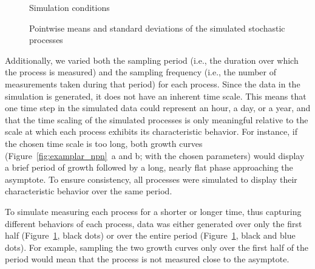 \documentclass[man, floatsintext]{apa7}
\begin{document}
\begin{figure}[!t]
  \caption{Simulation conditions}
  \label{fig:exemplar_pn}
\end{figure}

\begin{sidewaysfigure*}[htbp]
  \caption{Pointwise means and standard deviations of the simulated stochastic
    processes}
  \label{fig:stoch_mean_var}
\end{sidewaysfigure*}

Additionally, we varied both the sampling period (i.e., the duration over which
the process is measured) and the sampling frequency (i.e., the number of
measurements taken during that period) for each process. Since the data in the
simulation is generated, it does not have an inherent time scale. This means
that one time step in the simulated data could represent an hour, a day, or a
year, and that the time scaling of the simulated processes is only meaningful
relative to the scale at which each process exhibits its characteristic
behavior. For instance, if the chosen time scale is too long, both growth
curves (Figure~\ref{fig:examplar_npn}~a and b; with the chosen parameters)
would display a brief period of growth followed by a long, nearly flat phase
approaching the asymptote. To ensure consistency, all processes were simulated
to display their characteristic behavior over the same period.

To simulate measuring each process for a shorter or longer time, thus capturing
different behaviors of each process, data was either generated over only the
first half (Figure~\ref{fig:exemplar_pn}, black dots) or over the entire period
(Figure~\ref{fig:exemplar_pn}, black and blue dots). For example, sampling the
two growth curves only over the first half of the period would mean that the
process is not measured close to the asymptote.
\end{document}

